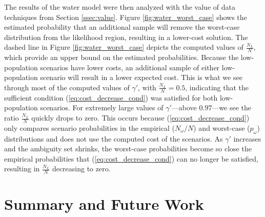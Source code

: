 \documentclass[opre,nonblindrev]{informs3} %
\begin{document}

The results of the water model were then analyzed with the value of data techniques from Section \ref{ssec:value}.
Figure \ref{fig:water_worst_case} shows the estimated probability that an additional sample will remove the worst-case distribution from the likelihood region, resulting in a lower-cost solution. %
The dashed line in Figure \ref{fig:water_worst_case} depicts the computed values of $\frac{N_L}{N}$, which provide an upper bound on the estimated probabilities. 
Because the low-population scenarios have lower costs, an additional sample of either low-population scenario will result in a lower expected cost.
This is what we see through most of the computed values of $\gamma'$, with $\frac{N_L}{N} = 0.5$, indicating that the sufficient condition (\ref{eq:cost_decrease_cond}) was satisfied for both low-population scenarios.
For extremely large values of $\gamma'$---above $0.97$---we see the ratio $\frac{N_L}{N}$ quickly drops to zero.
This occurs because (\ref{eq:cost_decrease_cond}) only compares scenario probabilities in the empirical ($N_\omega / N$) and worst-case ($p_\omega$) distributions and does not use the computed cost of the scenarios.
As $\gamma'$ increases and the ambiguity set shrinks, the worst-case probabilities become so close the empirical probabilities that (\ref{eq:cost_decrease_cond}) can no longer be satisfied, resulting in $\frac{N_L}{N}$ decreasing to zero.
% 

\section{Summary and Future Work}
\label{sec:concl}
\end{document}
